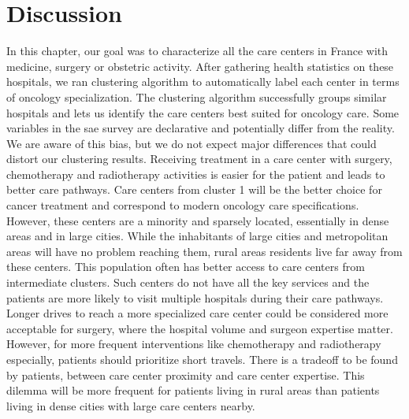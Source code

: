 \section{Discussion}
In this chapter, our goal was to characterize all the care centers in France
with medicine, surgery or obstetric activity. After gathering health statistics
on these hospitals, we ran clustering algorithm to automatically label each
center in terms of oncology specialization. The clustering algorithm
successfully groups similar hospitals and lets us identify the care centers best
suited for oncology care. Some variables in the \ac{sae} survey are declarative
and potentially differ from the reality. We are aware of this bias, but we do
not expect major differences that could distort our clustering results.
Receiving treatment in a care center with surgery, chemotherapy and radiotherapy
activities is easier for the patient and leads to better care pathways. Care
centers from cluster 1 will be the better choice for cancer treatment and
correspond to modern oncology care specifications. However, these centers are a
minority and sparsely located, essentially in dense areas and in large cities.
While the inhabitants of large cities and metropolitan areas will have no
problem reaching them, rural areas residents live far away from these centers.
This population often has better access to care centers from intermediate
clusters. Such centers do not have all the key services and the patients are
more likely to visit multiple hospitals during their care pathways. Longer
drives to reach a more specialized care center could be considered more
acceptable for surgery, where the hospital volume and surgeon expertise matter.
However, for more frequent interventions like chemotherapy and radiotherapy
especially, patients should prioritize short travels. There is a tradeoff to be
found by patients, between care center proximity and care center expertise. This
dilemma will be more frequent for patients living in rural areas than patients
living in dense cities with large care centers nearby.
